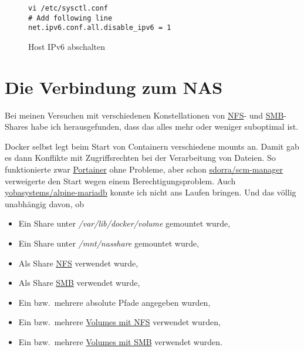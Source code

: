 \documentclass[12pt,a4paper]{article}
\newcommand{\code}[1]{\textit{#1}}
\begin{document}
\begin{figure}[H]
\begin{lstlisting}
vi /etc/sysctl.conf
# Add following line
net.ipv6.conf.all.disable_ipv6 = 1
\end{lstlisting}
\caption{Host IPv6 abschalten}\label{fig:IPv6 abschalten}
\end{figure}

\section{Die Verbindung zum NAS}
Bei meinen Versuchen mit verschiedenen Konstellationen von \href{https://de.wikipedia.org/wiki/Network_File_System}{NFS}-
und \href{https://de.wikipedia.org/wiki/Server_Message_Block}{SMB}-Shares habe ich herausgefunden, dass das alles mehr
oder weniger suboptimal ist.

Docker selbst legt beim Start von Containern verschiedene mounts an. Damit gab es dann Konflikte mit Zugriffsrechten bei
der Verarbeitung von Dateien. So funktionierte zwar \href{https://hub.docker.com/r/portainer/portainer/}{Portainer} ohne
Probleme, aber schon \href{https://hub.docker.com/r/sdorra/scm-manager}{sdorra/scm-manager} verweigerte den Start wegen
einem Berechtigungsproblem. Auch \href{https://hub.docker.com/r/yobasystems/alpine-mariadb}{yobasystems/alpine-mariadb}
konnte ich nicht ans Laufen bringen. Und das völlig unabhängig davon, ob

\begin{itemize}
    \item Ein Share unter \code{/var/lib/docker/volume} gemountet wurde,
    \item Ein Share unter \code{/mnt/nasshare} gemountet wurde,
    \item Als Share \href{https://de.wikipedia.org/wiki/Network_File_System}{NFS} verwendet wurde,
    \item Als Share \href{https://de.wikipedia.org/wiki/Server_Message_Block}{SMB} verwendet wurde,
    \item Ein bzw.\ mehrere absolute Pfade angegeben wurden,
    \item Ein bzw.\ mehrere \href{https://nerdblog.steinkopf.net/2017/12/persistente-docker-volumes-mit-nfs-und-cifs/}{Volumes mit NFS} verwendet wurden,
    \item Ein bzw.\ mehrere \href{https://nerdblog.steinkopf.net/2017/12/persistente-docker-volumes-mit-nfs-und-cifs/}{Volumes mit SMB} verwendet wurden.
\end{itemize}
\end{document}
